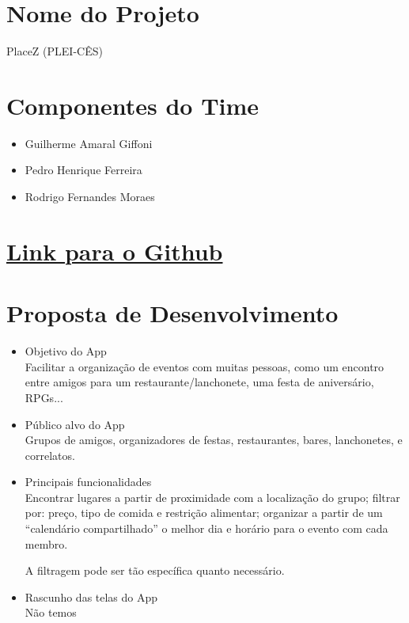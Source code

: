 \documentclass[12pt,a4paper]{article}
\begin{document}
\selectfont

\section{Nome do Projeto}
PlaceZ (PLEI-CÊS)

\section{Componentes do Time}
\begin{itemize}
    \item Guilherme Amaral Giffoni
    \item Pedro Henrique Ferreira
    \item Rodrigo Fernandes Moraes
\end{itemize}

\section{\href{https://github.com/guigiffoni/PlaceZ}{Link para o Github}}

\section{Proposta de Desenvolvimento}
\begin{itemize}
    \item Objetivo do App \\
    Facilitar a organização de eventos com muitas pessoas, como um encontro
    entre amigos para um restaurante/lanchonete, uma festa de aniversário,
    RPGs...

    \item Público alvo do App  \\
    Grupos de amigos, organizadores de festas, restaurantes, bares, lanchonetes,
    e correlatos.

    \item Principais funcionalidades \\
    Encontrar lugares a partir de proximidade com a localização do grupo;
    filtrar por: preço, tipo de comida e restrição alimentar; organizar a partir
    de um ``calendário compartilhado'' o melhor dia e horário para o evento com 
    cada membro.

    A filtragem pode ser tão específica quanto necessário.

    \item Rascunho das telas do App \\
    Não temos
    
\end{itemize}
\end{document}
